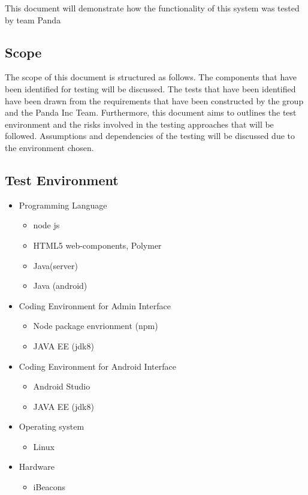 \documentclass[11pt]{article}
\begin{document}
This document will demonstrate how the functionality of this system was tested by team Panda

\subsection{Scope}
The scope of this document is structured as follows. The components that have been identified for testing will be discussed. The tests that have been identified have been drawn from the requirements that have been constructed by the group and the Panda Inc Team. Furthermore, this document aims to outlines the test environment and the risks involved in the testing approaches that will be followed. Assumptions and dependencies of the testing will be discussed due to the environment chosen.
\subsection{Test Environment}
\begin{itemize}
	\item Programming Language
	\begin{itemize}
		\item node js
		\item HTML5 web-components, Polymer
		\item Java(server)
		\item Java (android)
	\end{itemize}
	
	\item Coding Environment for Admin Interface
	\begin{itemize}
		\item Node package envrionment (npm)\\
		\item JAVA EE (jdk8)
	\end{itemize}
	
	\item Coding Environment for Android Interface
	\begin{itemize}
		\item Android Studio\\
		\item JAVA EE (jdk8)
	\end{itemize}
	
	\item Operating system
	\begin{itemize}
		\item Linux
	\end{itemize}
	
	\item Hardware
	\begin{itemize}
		\item iBeacons
	\end{itemize}
\end{itemize}
\end{document}
